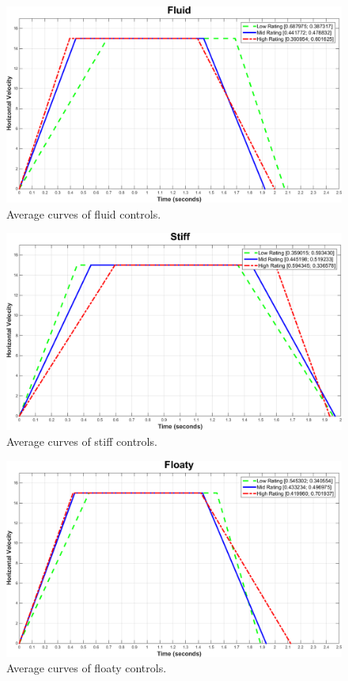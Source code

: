 \begin{figure}[htbp]
\centering
\includegraphics[width=0.9\columnwidth]{Pics/Curves/Fluid_curve}
\caption{Average curves of fluid controls.}
\label{fig:curve_fluid}
\end{figure}

\begin{figure}[htbp]
\centering
\includegraphics[width=0.9\columnwidth]{Pics/Curves/Stiff_curve}
\caption{Average curves of stiff controls.}
\label{fig:curve_stiff}
\end{figure}

\begin{figure}[htbp]
\centering
\includegraphics[width=0.9\columnwidth]{Pics/Curves/Floaty_curve}
\caption{Average curves of floaty controls.}
\label{fig:curve_floaty}
\end{figure}

